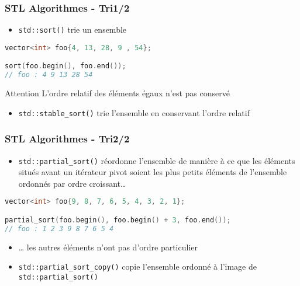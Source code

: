 \documentclass[C++.tex]{subfiles}
\begin{document}
\begin{frame}[fragile]
	\frametitle{STL Algorithmes - Tri\titlehfill{}1/2}


	\begin{itemize}
		\item \lstinline|std::sort()| trie un ensemble
	\end{itemize}

	\begin{lstlisting}[language=C++]
vector<int> foo{4, 13, 28, 9 , 54};

sort(foo.begin(), foo.end());
// foo : 4 9 13 28 54\end{lstlisting}

	\begin{alertblock}{Attention}
		L'ordre relatif des éléments égaux n'est pas conservé

	\end{alertblock}

	\begin{itemize}
		\item \lstinline|std::stable_sort()| trie l'ensemble en conservant l'ordre relatif
	\end{itemize}
\end{frame}

\begin{frame}[fragile]
	\frametitle{STL Algorithmes - Tri\titlehfill{}2/2}
	\begin{itemize}
		\item \lstinline|std::partial_sort()| réordonne l'ensemble de manière à ce que les éléments situés avant un itérateur pivot soient les plus petits éléments de l'ensemble ordonnés par ordre croissant\ldots
	\end{itemize}

	\begin{lstlisting}[language=C++]
vector<int> foo{9, 8, 7, 6, 5, 4, 3, 2, 1};

partial_sort(foo.begin(), foo.begin() + 3, foo.end());
// foo : 1 2 3 9 8 7 6 5 4\end{lstlisting}

	\begin{itemize}
		\item \ldots{} les autres éléments n'ont pas d'ordre particulier
		\item \lstinline|std::partial_sort_copy()| copie l'ensemble ordonné à l'image de \lstinline|std::partial_sort()|
	\end{itemize}
\end{frame}
\end{document}
